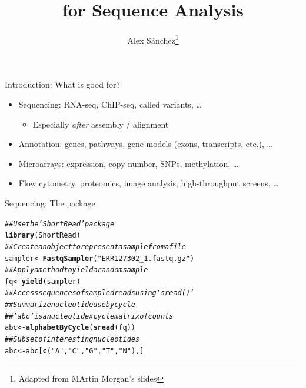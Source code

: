 \documentclass[xcolor=dvipsnames]{beamer}\usepackage[]{graphicx}\usepackage[]{color}
\title{\Bioconductor{} for Sequence Analysis}
\author{Alex S\'anchez\footnote{Adapted from MArtin Morgan's slides}}
\makeatletter
\newcommand{\hlstr}[1]{\textcolor[rgb]{0.192,0.494,0.8}{#1}}%
\newcommand{\hlcom}[1]{\textcolor[rgb]{0.678,0.584,0.686}{\textit{#1}}}%
\newcommand{\hlstd}[1]{\textcolor[rgb]{0.345,0.345,0.345}{#1}}%
\newcommand{\hlkwb}[1]{\textcolor[rgb]{0.69,0.353,0.396}{#1}}%
\newcommand{\hlkwd}[1]{\textcolor[rgb]{0.737,0.353,0.396}{\textbf{#1}}}%
\newenvironment{kframe}{%
 \def\at@end@of@kframe{}%
 \ifinner\ifhmode%
  \def\at@end@of@kframe{\end{minipage}}%
  \begin{minipage}{\columnwidth}%
 \fi\fi%
 \def\FrameCommand##1{\hskip\@totalleftmargin \hskip-\fboxsep
 \colorbox{shadecolor}{##1}\hskip-\fboxsep
     \hskip-\linewidth \hskip-\@totalleftmargin \hskip\columnwidth}%
 \MakeFramed {\advance\hsize-\width
   \@totalleftmargin\z@ \linewidth\hsize
   \@setminipage}}%
 {\par\unskip\endMakeFramed%
 \at@end@of@kframe}
\newenvironment{knitrout}{}{} %
\makeatother
\begin{document}
\maketitle

\begin{frame}{Introduction: What is \Bioconductor{} good for?}
  \begin{itemize}
  \item Sequencing: RNA-seq, ChIP-seq, called variants, \ldots 
    \begin{itemize}
    \item Especially \emph{after} assembly / alignment
    \end{itemize}
  \item Annotation: genes, pathways, gene models (exons, transcripts,
    etc.), \ldots
  \item Microarrays: expression, copy number, SNPs, methylation, \ldots
  \item Flow cytometry, proteomics, image analysis, high-throughput
    screens, \ldots
  \end{itemize}
\end{frame}


\begin{frame}[fragile]{Sequencing: The  package}
\begin{knitrout}
\color{fgcolor}\begin{kframe}
\begin{alltt}
\hlcom{## Use the 'ShortRead' package}
\hlkwd{library}\hlstd{(ShortRead)}
\hlcom{## Create an object to represent a sample from a file}
\hlstd{sampler} \hlkwb{<-} \hlkwd{FastqSampler}\hlstd{(}\hlstr{"ERR127302_1.fastq.gz"}\hlstd{)}
\hlcom{## Apply a method to yield a random sample}
\hlstd{fq} \hlkwb{<-} \hlkwd{yield}\hlstd{(sampler)}
\hlcom{## Access sequences of sampled reads using `sread()`}
\hlcom{## Summarize nucleotide use by cycle}
\hlcom{## 'abc' is a nucleotide x cycle matrix of counts}
\hlstd{abc} \hlkwb{<-} \hlkwd{alphabetByCycle}\hlstd{(}\hlkwd{sread}\hlstd{(fq))}
\hlcom{## Subset of interesting nucleotides}
\hlstd{abc} \hlkwb{<-} \hlstd{abc[}\hlkwd{c}\hlstd{(}\hlstr{"A"}\hlstd{,} \hlstr{"C"}\hlstd{,} \hlstr{"G"}\hlstd{,} \hlstr{"T"}\hlstd{,} \hlstr{"N"}\hlstd{),]}
\end{alltt}
\end{kframe}
\end{knitrout}
\end{frame}
\end{document}
